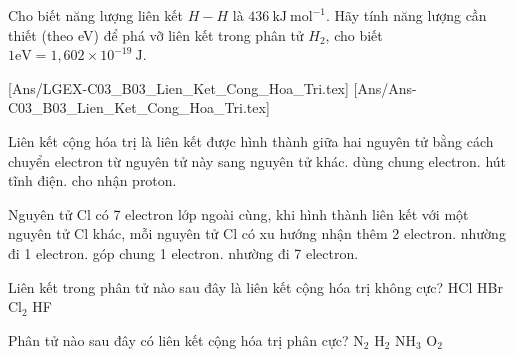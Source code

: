\begin{bt}[CD-SBT] Cho biết năng lượng liên kết $H-H$ là $436\mathrm{~kJ} \mathrm{~mol}^{-1}$. Hãy tính năng lượng cần thiết (theo eV) để phá vỡ liên kết trong phân tử $H_2$, cho biết $1\mathrm{eV}=1,602\times 10^{-19} \mathrm{~J}$.
\end{bt}
[Ans/LGEX-C03_B03_Lien_Ket_Cong_Hoa_Tri.tex]
[Ans/Ans-C03_B03_Lien_Ket_Cong_Hoa_Tri.tex]
\begin{ex}
	Liên kết cộng hóa trị là liên kết được hình thành giữa hai nguyên tử bằng cách
	\choice
	{chuyển electron từ nguyên tử này sang nguyên tử khác.}
	{\True dùng chung electron.}
	{hút tĩnh điện.}
	{cho nhận proton.}
\end{ex}
\begin{ex}
	Nguyên tử Cl có 7 electron lớp ngoài cùng, khi hình thành liên kết với một nguyên tử Cl khác, mỗi nguyên tử Cl có xu hướng
	\choice
	{nhận thêm 2 electron.}
	{nhường đi 1 electron.}
	{\True góp chung 1 electron.}
	{nhường đi 7 electron.}
\end{ex}
\begin{ex}
	Liên kết trong phân tử nào sau đây là liên kết cộng hóa trị không cực?
	\choice
	{HCl}
	{HBr}
	{\True Cl$_2$}
	{HF}
\end{ex}
\begin{ex}
	Phân tử nào sau đây có liên kết cộng hóa trị phân cực?
	\choice
	{N$_2$}
	{H$_2$}
	{\True NH$_3$}
	{O$_2$}
\end{ex}
